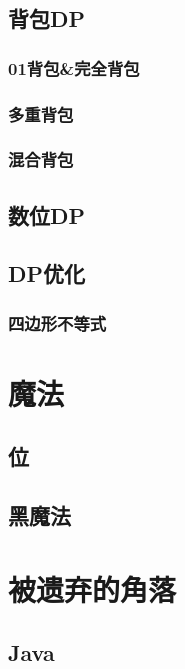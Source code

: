 \documentclass{article}
\begin{document}
\subsection{背包DP}
\subsubsection{01背包\&完全背包}

\subsubsection{多重背包}

\subsubsection{混合背包}


\subsection{数位DP}


\subsection{DP优化}
\subsubsection{四边形不等式}


\section{魔法}
\subsection{位}

\subsection{黑魔法}


\section{被遗弃的角落}
\subsection{Java}

\end{document}

